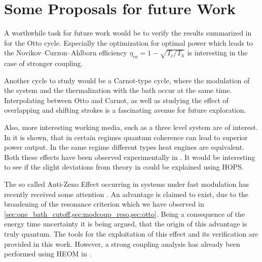 
\section{Some Proposals for future Work}
\label{sec:some-prop-future}
A worthwhile task for future work would be to verify the results
summarized in \cite{Binder2018} for the Otto cycle. Especially the
optimization for optimal power which leads to the
Novikov–Curzon–Ahlborn efficiency \(η_{ca}=1-\sqrt{T_{c}/T_{h}}\) is
interesting in the case of stronger coupling.

Another cycle to study would be a Carnot-type cycle, where the
modulation of the system and the thermalization with the bath occur at
the same time. Interpolating between Otto and Carnot, as well as
studying the effect of overlapping and shifting strokes is a
fascinating avenue for future exploration.

Also, more interesting working media, such as a three level system are
of interest. In \cite{Uzdin2015Sep} it is shown, that in certain
regimes quantum coherence can lead to superior power output. In the
same regime different types heat engines are equivalent. Both these
effects have been observed experimentally in \cite{Klatzow2019Mar}. It
would be interesting to see if the slight deviations from theory in
\cite{Klatzow2019Mar} could be explained using HOPS.

The so called Anti-Zeno Effect occurring in systems under fast
modulation has recently received some attention
\cite{Mukherjee2020Jan,Xu2022Mar}. An advantage is claimed to exist,
due to the broadening of the resonance criterion which we have
observed in
\cref{sec:one_bath_cutoff,sec:modcoup_reso,sec:otto}. Being a
consequence of the energy time uncertainty it is being argued, that
the origin of this advantage is truly quantum. The tools for the
exploitation of this effect and its verification are provided in this
work. However, a strong coupling analysis has already been performed
using HEOM in \cite{Xu2022Mar}.

